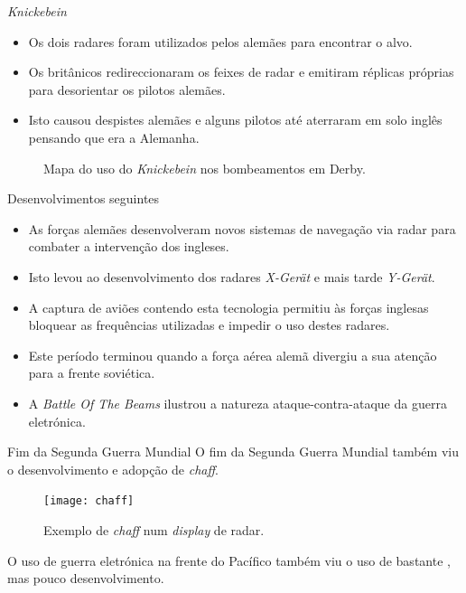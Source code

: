 \documentclass[portuguese,10pt]{beamer}
\begin{document}
\begin{frame}{\textit{Knickebein}}
    \begin{minipage}[c]{0.55\linewidth}
        \begin{itemize}
            \item<1-> Os dois radares foram utilizados pelos alemães para encontrar o alvo.
            \item<2-> Os britânicos redireccionaram os feixes de radar e emitiram réplicas próprias para desorientar os pilotos alemães.
            \item<3-> Isto causou despistes alemães e alguns pilotos até aterraram em solo inglês pensando que era a Alemanha.
        \end{itemize}
    \end{minipage}
    \hfill
    \begin{minipage}[c]{0.44\linewidth}
        \begin{figure}
            \centering
            {\tiny }
            \caption{Mapa do uso do \textit{Knickebein} nos bombeamentos em Derby.}
        \end{figure}
    \end{minipage}
\end{frame}

\begin{frame}{Desenvolvimentos seguintes}
    \begin{itemize}
        \item As forças alemães desenvolveram novos sistemas de navegação via radar para combater a intervenção dos ingleses.
        \item Isto levou ao desenvolvimento dos radares \textit{X-Gerät} e mais tarde \textit{Y-Gerät}.
        \item A captura de aviões contendo esta tecnologia permitiu às forças inglesas bloquear as frequências utilizadas e impedir o uso destes radares.
        \item Este período terminou quando a força aérea alemã divergiu a sua atenção para a frente soviética.
        \item A \textit{Battle Of The Beams} ilustrou a natureza ataque-contra-ataque da guerra eletrónica.
    \end{itemize}
\end{frame}

\begin{frame}{Fim da Segunda Guerra Mundial}
    O fim da Segunda Guerra Mundial também viu o desenvolvimento e adopção de \textit{chaff}.
    \begin{figure}
        \centering
        \texttt{[image: chaff]}
        \caption{Exemplo de \textit{chaff} num \textit{display} de radar.}
    \end{figure}
    O uso de guerra eletrónica na frente do Pacífico também viu o uso de bastante \jamming{}, mas pouco desenvolvimento.
\end{frame}
\end{document}
